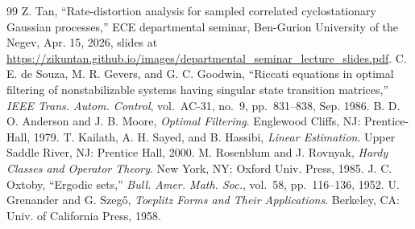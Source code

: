 \documentclass[11pt,onecolumn]{IEEEtran}
\begin{document}
\begin{thebibliography}{99}
 Z. Tan, ``Rate-distortion analysis for sampled
correlated cyclostationary Gaussian processes,'' ECE departmental
seminar, Ben-Gurion University of the Negev, Apr. 15, 2026, slides at
\url{https://zikuntan.github.io/images/departmental_seminar_lecture_slides.pdf}.
 C. E. de Souza, M. R. Gevers, and G. C. Goodwin,
``Riccati equations in optimal filtering of nonstabilizable systems
having singular state transition matrices,'' \emph{IEEE Trans. Autom.
Control}, vol.~AC-31, no.~9, pp.~831--838, Sep. 1986.
 B. D. O. Anderson and J. B. Moore,
\emph{Optimal Filtering}. Englewood Cliffs, NJ: Prentice-Hall, 1979.
 T. Kailath, A. H. Sayed, and B. Hassibi,
\emph{Linear Estimation}. Upper Saddle River, NJ: Prentice Hall, 2000.
 M. Rosenblum and J. Rovnyak, \emph{Hardy
Classes and Operator Theory}. New York, NY: Oxford Univ. Press, 1985.
 J. C. Oxtoby, ``Ergodic sets,'' \emph{Bull. Amer.
Math. Soc.}, vol.~58, pp.~116--136, 1952.
 U. Grenander and G. Szeg\H{o}, \emph{Toeplitz
Forms and Their Applications}. Berkeley, CA: Univ. of California Press,
1958.
\end{thebibliography}
\end{document}
